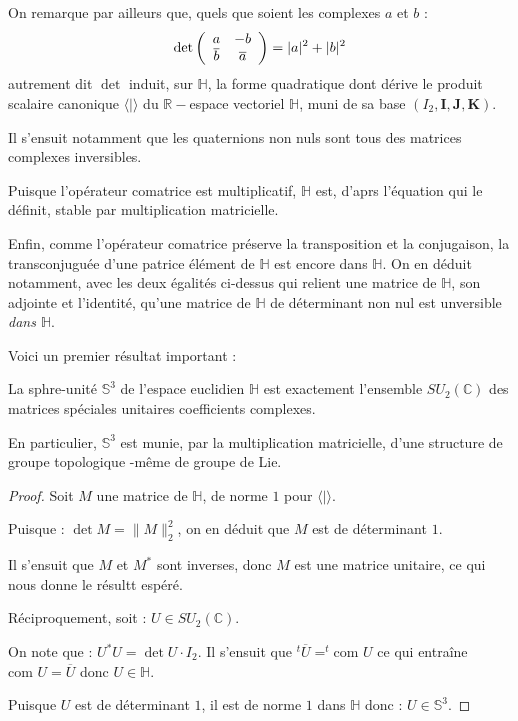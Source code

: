 \par
On remarque par ailleurs que, quels que soient les complexes $a$ et $b$ :
\[\det\left(\begin{array}{cc}a&-b\\\overline{b}&\overline{a}\end{array}\right)=|a|^2+|b|^2\]
autrement dit $\det$ induit, sur $\mathbb{H}$, la forme quadratique dont d\'erive le produit scalaire canonique $\langle | \rangle$ du $\mathbb{R}-$espace vectoriel $\mathbb{H}$, %
muni de sa base $(I_2,\mathbf{I},\mathbf{J},\mathbf{K})$.

\par
Il s'ensuit notamment que les quaternions non nuls sont tous des matrices complexes inversibles.

\par
Puisque l'op\'erateur \og{}comatrice\fg{} est multiplicatif, $\mathbb{H}$ est, d'aprs l'\'equation qui le d\'efinit, stable par multiplication matricielle.

\par
Enfin, comme l'op\'erateur \og{}comatrice\fg{} pr\'eserve la transposition et la conjugaison, %
la transconjugu\'ee d'une patrice \'el\'ement de $\mathbb{H}$ est encore dans $\mathbb{H}$. %
On en d\'eduit notamment, avec les deux \'egalit\'es ci-dessus qui relient une matrice de $\mathbb{H}$, son adjointe et l'identit\'e, %
qu'une matrice de $\mathbb{H}$ de d\'eterminant non nul est unversible \emph{dans $\mathbb{H}$}.

\par
Voici un premier r\'esultat important :

\begin{prop}
La sphre-unit\'e $\mathbb{S}^3$ de l'espace euclidien $\mathbb{H}$ est exactement l'ensemble $SU_2(\mathbb{C})$ des matrices sp\'eciales unitaires  coefficients complexes.
\par
En particulier, $\mathbb{S}^3$ est munie, par la multiplication matricielle, d'une structure de groupe topologique -m\^eme de groupe de Lie.
\end{prop}

\begin{proof}
Soit $M$ une matrice de $\mathbb{H}$, de norme $1$ pour $\langle | \rangle$.

\par
Puisque : $\det M=\|M\|_2^2$, on en d\'eduit que $M$ est de d\'eterminant $1$.

\par
Il s'ensuit que $M$ et $M^{\ast}$ sont inverses, donc $M$ est une matrice unitaire, ce qui nous donne le r\'esultt esp\'er\'e.

\par
R\'eciproquement, soit : $U\in SU_2(\mathbb{C})$.

\par
On note que : $U^{\ast}U=\det U\cdot I_2$. Il s'ensuit que $^t\overline{U}=^t\text{com }U$ ce qui entra\^ine $\text{com }U=\overline{U}$ donc $U\in\mathbb{H}$.

\par
Puisque $U$ est de d\'eterminant $1$, il est de norme $1$ dans $\mathbb{H}$ donc : $U\in\mathbb{S}^3$.
\end{proof}

